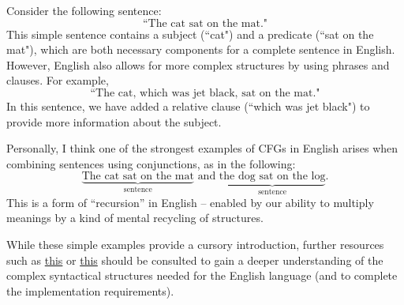 \documentclass{article}
\begin{document}
    \vspace{2mm}
    Consider the following sentence:$$\text{``The cat sat on the mat."}$$ This simple sentence contains a subject (``cat") and a predicate (``sat on the mat"), which are both necessary components for a complete sentence in English. However, English also allows for more complex structures by using phrases and clauses. For example, $$\text{``The cat, which was jet black, sat on the mat."}$$ In this sentence, we have added a relative clause (``which was jet black") to provide more information about the subject.

    \vspace{2mm}
    Personally, I think one of the strongest examples of CFGs in English arises when combining sentences using conjunctions, as in the following: 
    $$\underbrace{\text{The cat sat on the mat}}_{\text{sentence}}\text{ and }\underbrace{\text{the dog sat on the log}}_{\text{sentence}}.$$ 
    This is a form of “recursion” in English -- enabled by our ability to multiply meanings by a kind of mental recycling of structures.

    \vspace{2mm}
    While these simple examples provide a cursory introduction, further resources such as \href{http://www.cs.columbia.edu/~mcollins/cs4705-spring2020/slides/parsing1.pdf}{this} or \href{http://faculty.washington.edu/cicero/370syntax.htm}{this} should be consulted to gain a deeper understanding of the complex syntactical structures needed for the English language (and to complete the implementation requirements).
\end{document}
